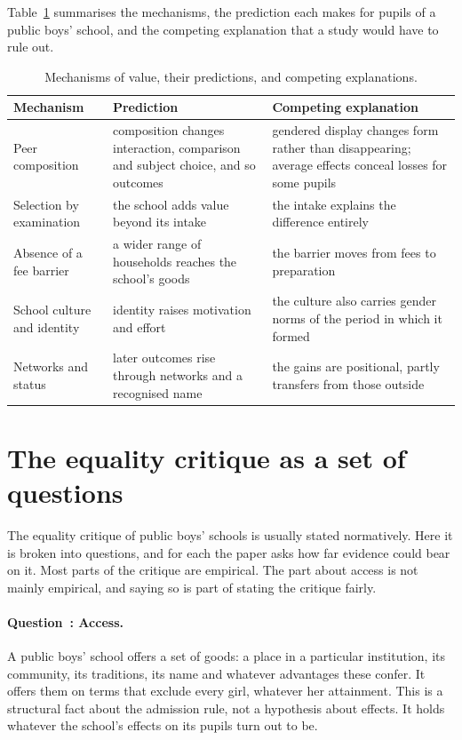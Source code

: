 \documentclass[11pt]{article}
\newcounter{mech}
\newcounter{eqq}
\newcommand{\eqq}[1]{\refstepcounter{eqq}\paragraph{Question~\theeqq: #1.}}
\begin{document}
Table~\ref{tab:mechanisms} summarises the mechanisms, the prediction each makes for pupils of a public boys' school, and the competing explanation that a study would have to rule out.

\begin{table}[ht]
\centering
\small
\begin{tabular}{>{\raggedright\arraybackslash}p{2.8cm}>{\raggedright\arraybackslash}p{5.4cm}>{\raggedright\arraybackslash}p{5.6cm}}
\toprule
Mechanism & Prediction & Competing explanation\\
\midrule
Peer composition & composition changes interaction, comparison and subject choice, and so outcomes & gendered display changes form rather than disappearing; average effects conceal losses for some pupils\\
Selection by examination & the school adds value beyond its intake & the intake explains the difference entirely\\
Absence of a fee barrier & a wider range of households reaches the school's goods & the barrier moves from fees to preparation\\
School culture and identity & identity raises motivation and effort & the culture also carries gender norms of the period in which it formed\\
Networks and status & later outcomes rise through networks and a recognised name & the gains are positional, partly transfers from those outside\\
\bottomrule
\end{tabular}
\caption{Mechanisms of value, their predictions, and competing explanations.}\label{tab:mechanisms}
\end{table}

\section{The equality critique as a set of questions}\label{sec:critique}

The equality critique of public boys' schools is usually stated normatively. Here it is broken into questions, and for each the paper asks how far evidence could bear on it. Most parts of the critique are empirical. The part about access is not mainly empirical, and saying so is part of stating the critique fairly.

\eqq{Access}\label{eq:access}
A public boys' school offers a set of goods: a place in a particular institution, its community, its traditions, its name and whatever advantages these confer. It offers them on terms that exclude every girl, whatever her attainment. This is a structural fact about the admission rule, not a hypothesis about effects. It holds whatever the school's effects on its pupils turn out to be.
\end{document}
